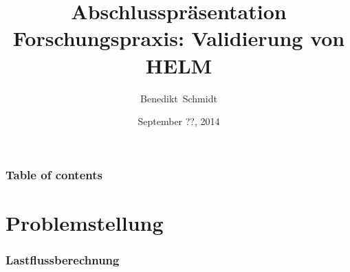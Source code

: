 \documentclass[hyperref={pdfpagelabels=false},compress]{beamer}
\title{Abschlusspräsentation Forschungspraxis: Validierung von HELM}
\author[Schmidt]{
  Benedikt~Schmidt
}
\institute
{
	Technische Universität München, Germany
}
\date{September ??, 2014}
\begin{document}
\begin{frame}
	\titlepage
\end{frame}

\begin{frame}
	\frametitle{Table of contents}
	\tableofcontents
\end{frame}

\section{Problemstellung}
\begin{frame}
	\frametitle{Lastflussberechnung}
\end{frame}
\end{document}
